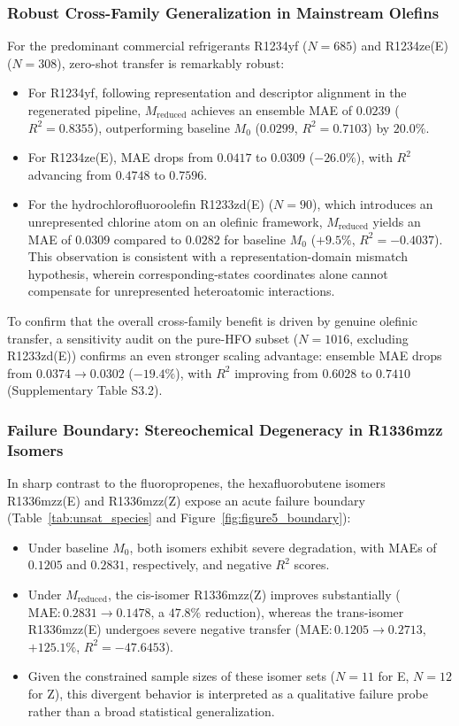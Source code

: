 \subsubsection{Robust Cross-Family Generalization in Mainstream Olefins}
For the predominant commercial refrigerants R1234yf ($N=685$) and R1234ze(E) ($N=308$), zero-shot transfer is remarkably robust:
\begin{itemize}
    \item For R1234yf, following representation and descriptor alignment in the regenerated pipeline, $M_{\mathrm{reduced}}$ achieves an ensemble MAE of $0.0239$ ($R^2 = 0.8355$), outperforming baseline $M_0$ ($0.0299$, $R^2 = 0.7103$) by $20.0\%$.
    \item For R1234ze(E), MAE drops from $0.0417$ to $0.0309$ ($-26.0\%$), with $R^2$ advancing from $0.4748$ to $0.7596$.
    \item For the hydrochlorofluoroolefin R1233zd(E) ($N=90$), which introduces an unrepresented chlorine atom on an olefinic framework, $M_{\mathrm{reduced}}$ yields an MAE of $0.0309$ compared to $0.0282$ for baseline $M_0$ ($+9.5\%$, $R^2 = -0.4037$). This observation is consistent with a representation-domain mismatch hypothesis, wherein corresponding-states coordinates alone cannot compensate for unrepresented heteroatomic interactions.
\end{itemize}

To confirm that the overall cross-family benefit is driven by genuine olefinic transfer, a sensitivity audit on the pure-HFO subset ($N=1016$, excluding R1233zd(E)) confirms an even stronger scaling advantage: ensemble MAE drops from $0.0374 \to 0.0302$ ($-19.4\%$), with $R^2$ improving from $0.6028$ to $0.7410$ (Supplementary Table S3.2).

\subsubsection{Failure Boundary: Stereochemical Degeneracy in R1336mzz Isomers}
In sharp contrast to the fluoropropenes, the hexafluorobutene isomers R1336mzz(E) and R1336mzz(Z) expose an acute failure boundary (Table~\ref{tab:unsat_species} and Figure~\ref{fig:figure5_boundary}):
\begin{itemize}
    \item Under baseline $M_0$, both isomers exhibit severe degradation, with MAEs of $0.1205$ and $0.2831$, respectively, and negative $R^2$ scores.
    \item Under $M_{\mathrm{reduced}}$, the cis-isomer R1336mzz(Z) improves substantially ($\text{MAE}: 0.2831 \to 0.1478$, a $47.8\%$ reduction), whereas the trans-isomer R1336mzz(E) undergoes severe negative transfer ($\text{MAE}: 0.1205 \to 0.2713$, $+125.1\%$, $R^2 = -47.6453$).
    \item Given the constrained sample sizes of these isomer sets ($N=11$ for E, $N=12$ for Z), this divergent behavior is interpreted as a qualitative failure probe rather than a broad statistical generalization.
\end{itemize}

